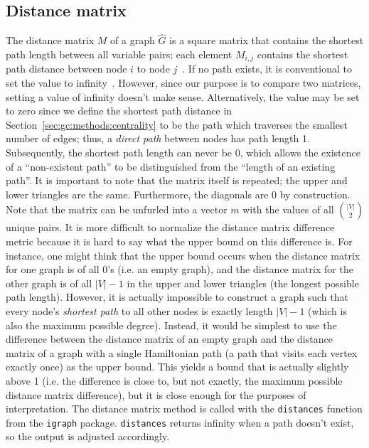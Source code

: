 \subsection{Distance matrix}

The distance matrix $M$ of a graph $\hat{G}$ is a square matrix that 
contains the shortest path length 
between all variable pairs; each element $M_{i,j}$ 
contains the shortest path distance between node $i$ to node $j$~\cite{igraph}. 
If no path exists, it is conventional to set the value to 
infinity~\cite{igraph}. However, since our 
purpose is to compare two matrices, setting a value of infinity doesn't 
make sense. Alternatively, the value may be set to zero since we define the 
shortest path distance in Section~\ref{sec:gc:methods:centrality} to be 
the path which traverses the smallest number of edges; thus, a 
\textit{direct path} between nodes has path length 1. Subsequently, the 
shortest path length can never be 0, which allows the 
existence of a ``non-existent path'' to be distinguished from the ``length of 
an existing path''. It is important to note that the matrix itself is repeated; 
the upper and lower triangles are the same. Furthermore, the diagonals are 0 by 
construction. Note that the matrix can be unfurled into a vector 
$m$ with the values of all $\binom{|V|}{2}$ unique pairs.
It is more difficult to normalize the distance matrix difference metric because 
it is hard to say what the upper bound on this difference is. For instance, one 
might think that the upper bound occurs when the distance matrix for one graph 
is of all 0's (i.e. an empty graph), and the distance matrix for the other 
graph is of all $|V|-1$ in the upper and lower triangles (the longest possible 
path length). However, it is actually impossible to construct a graph such that 
every node's \textit{shortest path} to all other nodes is exactly length 
$|V|-1$ (which is also the maximum possible degree).
Instead, it would be simplest to use the difference between the distance matrix 
of an empty graph and the distance matrix of a graph with a single Hamiltonian 
path (a path that visits each vertex exactly once) as the upper bound. This 
yields a bound that is actually slightly above 1 (i.e. the
difference is close to, but not exactly, the maximum possible distance matrix 
difference), but it is close enough for the purposes 
of interpretation. 
The distance matrix method is called with the \texttt{distances} function from 
the \texttt{igraph} package. \texttt{distances} returns infinity when a path 
doesn't exist, so the output is adjusted accordingly.

